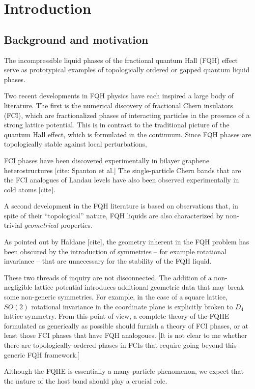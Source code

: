 \documentclass[aps,prb,twocolumn,letterpaper,twoside,nobalancelastpage,groupedaddress,amsmath,amssymb,floatfix,citeautoscript]{revtex4-1}
\begin{document}
\section{Introduction}
\subsection{Background and motivation}
The incompressible liquid phases of the fractional quantum Hall (FQH) effect serve as prototypical examples of topologically ordered or gapped quantum liquid phases.

Two recent developments in FQH physics have each inspired a large body of literature. The first is the numerical discovery of fractional Chern insulators (FCI), which are fractionalized phases of interacting particles in the presence of a strong lattice potential. This is in contrast to the traditional picture of the quantum Hall effect, which is formulated in the continuum. Since FQH phases are topologically stable against local perturbations,

FCI phases have been discovered experimentally in bilayer graphene heterostructures [cite: Spanton et al.] The single-particle Chern bands that are the FCI analogues of Landau levels have also been observed experimentally in cold atoms [cite].

A second development in the FQH literature is based on observations that, in spite of their ``topological'' nature, FQH liquids are also characterized by non-trivial \textit{geometrical} properties.

As pointed out by Haldane [cite], the geometry inherent in the FQH problem has been obscured by the introduction of symmetries -- for example rotational invariance -- that are unnecessary for the stability of the FQH liquid. 

These two threads of inquiry are not disconnected. The addition of a non-negligible lattice potential introduces additional geometric data that may break some non-generic symmetries. For example, in the case of a square lattice, $SO(2)$ rotational invariance in the coordinate plane is explicitly broken to $D_4$ lattice symmetry. From this point of view, a complete theory of the FQHE formulated as generically as possible should furnish a theory of FCI phases, or at least those FCI phases that have FQH analogoues. [It is not clear to me whether there are topologically-ordered phases in FCIs that require going beyond this generic FQH framework.]


Although the FQHE is essentially a many-particle phenomenon, we expect that the nature of the host band should play a crucial role. 
\end{document}
